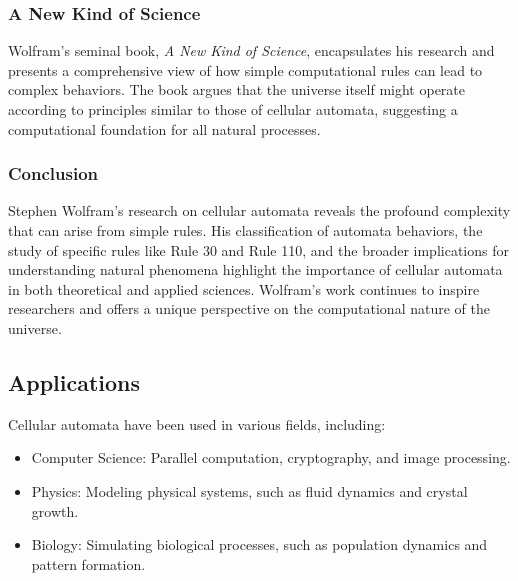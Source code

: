 \documentclass[9pt,a4paper,twoside]{tau-class/tau}
\begin{document}
    \subsubsection{A New Kind of Science}

    Wolfram's seminal book, \textit{A New Kind of Science}, encapsulates his research and presents a comprehensive view of how simple computational rules can lead to complex behaviors. The book argues that the universe itself might operate according to principles similar to those of cellular automata, suggesting a computational foundation for all natural processes.

    \subsubsection{Conclusion}

    Stephen Wolfram's research on cellular automata reveals the profound complexity that can arise from simple rules. His classification of automata behaviors, the study of specific rules like Rule 30 and Rule 110, and the broader implications for understanding natural phenomena highlight the importance of cellular automata in both theoretical and applied sciences. Wolfram's work continues to inspire researchers and offers a unique perspective on the computational nature of the universe.





    \subsection{Applications}
	
        Cellular automata have been used in various fields, including:
        
        \begin{itemize}
            \item Computer Science: Parallel computation, cryptography, and image processing.
            \item Physics: Modeling physical systems, such as fluid dynamics and crystal growth.
            \item Biology: Simulating biological processes, such as population dynamics and pattern formation.
        \end{itemize}
		
\end{document}
